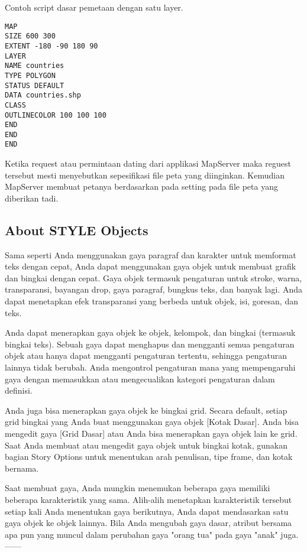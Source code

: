 Contoh script dasar pemetaan dengan satu layer.
\begin{verbatim}
MAP
SIZE 600 300
EXTENT -180 -90 180 90
LAYER
NAME countries
TYPE POLYGON
STATUS DEFAULT
DATA countries.shp
CLASS
OUTLINECOLOR 100 100 100
END
END
END
\end{verbatim}

Ketika request atau permintaan dating dari applikasi MapServer maka reguest tersebut mesti menyebutkan sepesifikasi 
file peta yang diinginkan. Kemudian MapServer membuat petanya berdasarkan pada setting pada file peta yang diberikan tadi.

\subsection{About STYLE Objects}
Sama seperti Anda menggunakan gaya paragraf dan karakter untuk memformat teks dengan cepat, Anda dapat menggunakan gaya objek untuk membuat grafik dan bingkai dengan cepat. Gaya objek termasuk pengaturan untuk stroke, warna, transparansi, bayangan drop, gaya paragraf, bungkus teks, dan banyak lagi. Anda dapat menetapkan efek transparansi yang berbeda untuk objek, isi, goresan, dan teks.

Anda dapat menerapkan gaya objek ke objek, kelompok, dan bingkai (termasuk bingkai teks). Sebuah gaya dapat menghapus dan mengganti semua pengaturan objek atau hanya dapat mengganti pengaturan tertentu, sehingga pengaturan lainnya tidak berubah. Anda mengontrol pengaturan mana yang mempengaruhi gaya dengan memasukkan atau mengecualikan kategori pengaturan dalam definisi.

Anda juga bisa menerapkan gaya objek ke bingkai grid. Secara default, setiap grid bingkai yang Anda buat menggunakan gaya objek [Kotak Dasar]. Anda bisa mengedit gaya [Grid Dasar] atau Anda bisa menerapkan gaya objek lain ke grid. Saat Anda membuat atau mengedit gaya objek untuk bingkai kotak, gunakan bagian Story Options untuk menentukan arah penulisan, tipe frame, dan kotak bernama.

Saat membuat gaya, Anda mungkin menemukan beberapa gaya memiliki beberapa karakteristik yang sama. Alih-alih menetapkan karakteristik tersebut setiap kali Anda menentukan gaya berikutnya, Anda dapat mendasarkan satu gaya objek ke objek lainnya. Bila Anda mengubah gaya dasar, atribut bersama apa pun yang muncul dalam perubahan gaya "orang tua" pada gaya "anak" juga.
------
